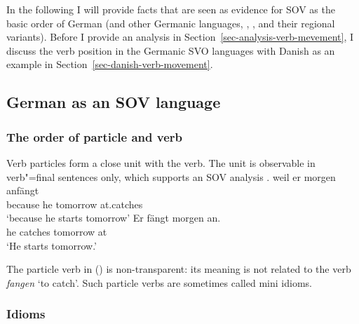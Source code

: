 
In the following I will provide facts that are seen as evidence for SOV as the basic order of German
(and other Germanic languages, \eg {}, ,  and their regional
variants). Before I provide an analysis in Section~\ref{sec-analysis-verb-mevement}, I discuss the 
verb position in the Germanic SVO languages with Danish as an example in Section~\ref{sec-danish-verb-movement}.

\subsection{German as an SOV language}
\label{sec-German-as-SOV}

\subsubsection{The order of particle and verb}

Verb particles form a close unit with the verb. The unit is observable in verb"=final sentences only,
which supports an SOV analysis \citep[]{Bierwisch63a}. 
\eal
\ex 
\gll weil er morgen anfängt\\
     because he tomorrow at.catches\\
\glt `because he starts tomorrow'
\ex 
\gll Er fängt morgen an.\\
     he catches tomorrow at\\
\glt `He starts tomorrow.'
\zl

\largerpage
\noindent
The particle verb in () is non-transparent: its meaning is not related to the verb
\emph{fangen} `to catch'. Such particle verbs are sometimes called mini
idioms. 

\subsubsection{Idioms}

